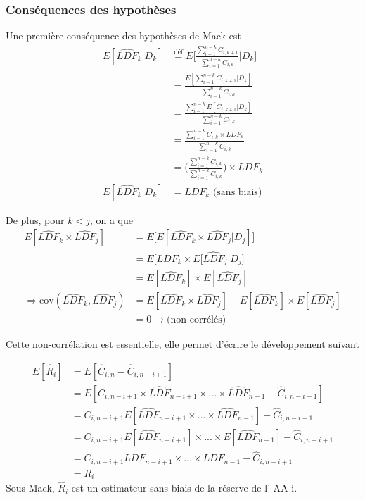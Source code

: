 \documentclass[11pt,french]{report}
\begin{document}
\subsubsection*{Conséquences des hypothèses}

Une première conséquence des hypothèses de Mack est 
\begin{align*}
E[\widehat{LDF}_k|D_k] &\overset{\text{déf}}{=} E \Bigg[ \frac{\sum_{i =1}^{n-k} C_{i,k+1}}{\sum_{i =1}^{n-k} C_{i,k}} \bigg| D_k \Bigg] \\
&= \frac{E[\sum_{i =1}^{n-k} C_{i,k+1} |D_k] }{\sum_{i =1}^{n-k} C_{i,k}} \\
&= \frac{\sum_{i =1}^{n-k} E[ C_{i,k+1} |D_k] }{\sum_{i =1}^{n-k} C_{i,k}} \\
&= \frac{\sum_{i =1}^{n-k} C_{i,k} \times LDF_k }{\sum_{i =1}^{n-k} C_{i,k}} \\
&= \Bigg( \frac{\sum_{i =1}^{n-k} C_{i,k}}{\sum_{i =1}^{n-k} C_{i,k}} \Bigg) \times LDF_k \\
E[\widehat{LDF}_k|D_k] &= LDF_k \text{ (sans biais)}
\end{align*}


De plus, pour $k<j$, on a que
\begin{align*}
E[\widehat{LDF}_k \times \widehat{LDF}_j] &= E \Big[ E[ \widehat{LDF}_k \times \widehat{LDF}_j | D_j]\Big] \\
&= E \Big[ LDF_k \times E[\widehat{LDF}_j |D_j \Big] \\
&= E [ \widehat{LDF}_k ] \times E[\widehat{LDF}_j] \\
\Rightarrow \text{cov}(\widehat{LDF}_k, \widehat{LDF}_j) &= E[\widehat{LDF}_k \times \widehat{LDF}_j] - E [ \widehat{LDF}_k ] \times E[\widehat{LDF}_j] \\
&= 0 \rightarrow \text{(non corrélés)}
\end{align*}

Cette non-corrélation est essentielle, elle permet d'écrire le développement suivant

\begin{align*}
E[\widehat{R}_i] &= E[\widehat{C}_{i,n} - \widehat{C}_{i, n-i+1}] \\
&= E[C_{i,n - i + 1} \times \widehat{LDF}_{n-i+1} \times ... \times \widehat{LDF}_{n-1} - \widehat{C}_{i, n-i+1}] \\
&= C_{i,n - i + 1} E[\widehat{LDF}_{n-i+1} \times ... \times \widehat{LDF}_{n-1}] - \widehat{C}_{i, n-i+1} \\
&= C_{i,n - i + 1} E[\widehat{LDF}_{n-i+1}] \times ... \times E[\widehat{LDF}_{n-1}] - \widehat{C}_{i, n-i+1} \\
&= C_{i,n - i + 1} LDF_{n-i+1} \times ... \times LDF_{n-1} - \widehat{C}_{i, n-i+1} \\
&= R_i
\end{align*}
Sous Mack, $\widehat{R}_i$ est un estimateur sans biais de la réserve de l' AA i.
\end{document}
